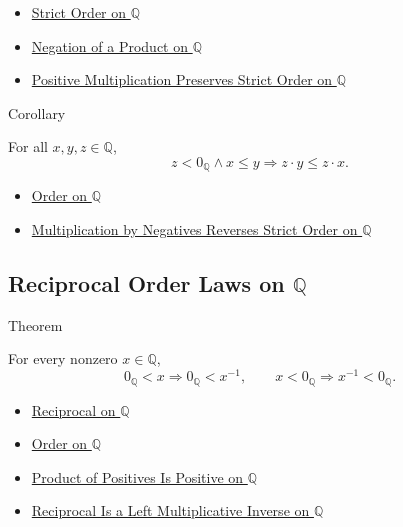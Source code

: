 \begin{dependencies}
\begin{itemize}
  \item \hyperref[def:strict-order-on-q]{Strict Order on $\mathbb{Q}$}
  \item \hyperref[cor:negation-of-product-on-q]{Negation of a Product on $\mathbb{Q}$}
  \item \hyperref[thm:positive-multiplication-preserves-strict-order-on-q]{Positive Multiplication Preserves Strict Order on $\mathbb{Q}$}
\end{itemize}
\end{dependencies}

\begin{corollarybox}{Corollary}
\begin{corollary}
\label{cor:negative-multiplication-reverses-order-on-q}
For all $x,y,z\in\mathbb{Q}$,
\[
z<0_{\mathbb{Q}}\land x\le y
\Longrightarrow
z\cdot y\le z\cdot x.
\]
\end{corollary}
\end{corollarybox}

\begin{dependencies}
\begin{itemize}
  \item \hyperref[def:order-on-q]{Order on $\mathbb{Q}$}
  \item \hyperref[thm:negative-multiplication-reverses-strict-order-on-q]{Multiplication by Negatives Reverses Strict Order on $\mathbb{Q}$}
\end{itemize}
\end{dependencies}

\subsection*{Reciprocal Order Laws on $\mathbb{Q}$}

\begin{theorembox}{Theorem}
\begin{theorem}
\label{thm:sign-of-reciprocal-q}
For every nonzero $x\in\mathbb{Q}$,
\[
0_{\mathbb{Q}}<x \Longrightarrow 0_{\mathbb{Q}}<x^{-1},
\qquad
x<0_{\mathbb{Q}} \Longrightarrow x^{-1}<0_{\mathbb{Q}}.
\]
\end{theorem}
\end{theorembox}

\begin{dependencies}
\begin{itemize}
  \item \hyperref[def:reciprocal-on-q-classes]{Reciprocal on $\mathbb{Q}$}
  \item \hyperref[def:order-on-q]{Order on $\mathbb{Q}$}
  \item \hyperref[prop:product-of-positives-is-positive-q]{Product of Positives Is Positive on $\mathbb{Q}$}
  \item \hyperref[thm:reciprocal-left-multiplicative-inverse-on-q]{Reciprocal Is a Left Multiplicative Inverse on $\mathbb{Q}$}
\end{itemize}
\end{dependencies}

